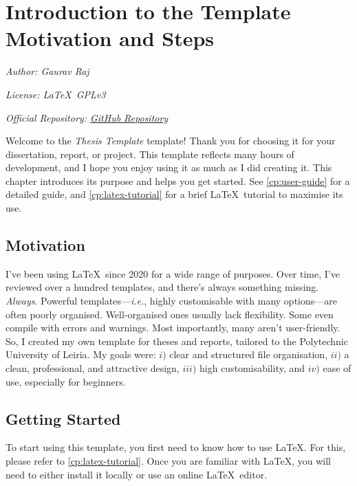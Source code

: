 \chapter[Introduction to the Template: Motivation and First Steps]{Introduction to the Template Motivation and Steps}
\label{cp:introduction}

{
	\parindent0pt

	\textit{Author: Gaurav Raj}

	\textit{License: \LaTeX~GPLv3}

	\textit{Official Repository: \href{https://github.com/thehackersbrain/thesis-template}{GitHub Repository}}

	\vspace{.935em}

	Welcome to the \textcolor{maincolor}{\textit{Thesis Template}} template! Thank you for choosing it for your dissertation, report, or project. This template reflects many hours of development, and I hope you enjoy using it as much as I did creating it. This chapter introduces its purpose and helps you get started. See \autoref{cp:user-guide} for a detailed guide, and \autoref{cp:latex-tutorial} for a brief \LaTeX~tutorial to maximise its use.
}

\section{Motivation}
I've been using \LaTeX~since 2020 for a wide range of purposes. Over time, I've reviewed over a hundred templates, and there's always something missing. \textit{Always}. Powerful templates---\textit{i.e.}, highly customisable with many options---are often poorly organised. Well-organised ones usually lack flexibility. Some even compile with errors and warnings. Most importantly, many aren't user-friendly. So, I created my own template for theses and reports, tailored to the Polytechnic University of Leiria. My goals were: \(i)\) clear and structured file organisation, \(ii)\) a clean, professional, and attractive design, \(iii)\) high customisability, and \(iv)\) ease of use, especially for beginners.


\section{Getting Started}
To start using this template, you first need to know how to use \LaTeX. For this, please refer to \autoref{cp:latex-tutorial}. Once you are familiar with \LaTeX, you will need to either install it locally or use an online \LaTeX~editor.

